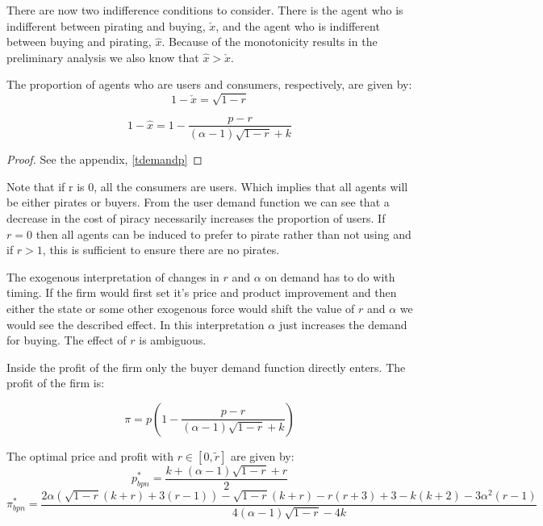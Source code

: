 There are now two indifference conditions to consider. There is the agent who is indifferent between pirating and buying, $\check{x}$, and the agent who is indifferent between buying and pirating, $\hat{x}$. Because of the monotonicity results in the preliminary analysis we also know that $\hat{x}>\check{x}$.  

\begin{proposition}\label{tdemand}
The proportion of agents who are users and consumers, respectively, are given by:
\begin{equation}\label{eq:1}
1 -\check{x} = \sqrt{1-r}
\end{equation}

\begin{equation}\label{eq:2}
1 - \hat{x}= 1 - \frac{p-r}{(\alpha - 1) \sqrt{1-r} +k}
\end{equation}


\end{proposition}

\begin{proof}
See the appendix, \ref{tdemandp}
\end{proof}

Note that if r is 0, all the consumers are users. Which implies that all agents will be either pirates or buyers. From the user demand function we can see that a decrease in the cost of piracy necessarily increases the proportion of users. If $r=0$ then all agents can be induced to prefer to pirate rather than not using and if $r>1$, this is sufficient to ensure there are no pirates. 

The exogenous interpretation of changes in $r$ and $\alpha$ on demand has to do with timing. If the firm would first set it's price and product improvement and then either the state or some other exogenous force would shift the value of $r$ and $\alpha$ we would see the described effect. In this interpretation $\alpha$ just increases the demand for buying. The effect of $r$ is ambiguous. 

Inside the profit of the firm only the buyer demand function directly enters. The profit of the firm is: 

\begin{equation*}
\pi = p\left( 
1 - \frac{p-r}{(\alpha - 1) \sqrt{1-r} +k}
\right) 
\end{equation*}

\begin{proposition}
The optimal price and profit with $r \in[0, \tilde{r}]$ are given by:
\begin{equation}\label{TNB}
p_{bpn}^* = \frac{k+ (\alpha-1)\sqrt{ 1 -r }+r}{2}
\end{equation}
\begin{equation}
\pi_{bpn}^* = \frac{2 \alpha \left( \sqrt{1-r}(k+r)+3(r-1) \right)-\sqrt{1-r}(k+r)-r(r+3)+3-k(k+2)-3 \alpha^2 (r-1)}{4 (  \alpha -1 ) \sqrt{1-r}-4 k }
\end{equation}
\end{proposition}

